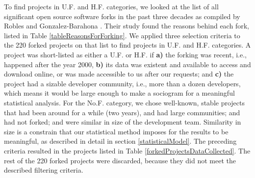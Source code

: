 \documentclass[11pt]{report}
\begin{document}
To find projects in U.F. and H.F. categories, we looked at the list of all significant open source software forks in the past three decades as compiled by Robles and Gonzalez-Barahona \cite{Robles}. Their study found the reasons behind each fork, listed in Table \ref{tableReasonsForForking}. We applied three selection criteria to the 220 forked projects on that list to find projects in U.F. and H.F. categories. A project was short-listed as either a U.F. or H.F. if \textbf{a)} the forking was recent, i.e., happened after the year 2000, \textbf{b)} its data was existent and available to access and download online, or was made accessible to us after our requests; and \textbf{c)} the project had a sizable developer community, i.e., more than a dozen developers, which means it would be large enough to make a sociogram for a meaningful statistical analysis. For the No.F. category, we chose well-known, stable projects that had been around for a while (two years), and had large communities; and had not forked; and were similar in size of the development team. Similarity in size is a constrain that our statistical method imposes for the results to be meaningful, as described in detail in section \ref{statisticalModel}.  The preceding criteria resulted in the projects listed in Table \ref{forkedProjectsDataCollected}. The rest of the 220 forked projects were discarded, because they did not meet the described filtering criteria.
\end{document}
